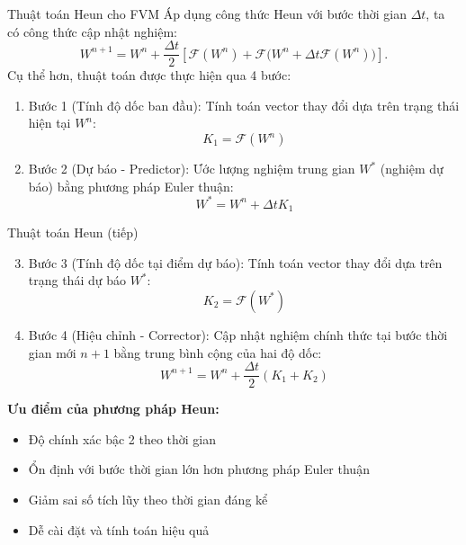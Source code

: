 \documentclass[aspectratio=43,10pt]{beamer}
\begin{document}
\begin{frame}{Thuật toán Heun cho FVM}
Áp dụng công thức Heun với bước thời gian $\Delta t$, ta có công thức cập nhật nghiệm:
\[
W^{n+1} = W^n + \frac{\Delta t}{2} \left[ \mathcal{F}(W^n) + \mathcal{F}\Big(W^n + \Delta t \mathcal{F}(W^n)\Big)\right].
\]
Cụ thể hơn, thuật toán được thực hiện qua 4 bước:
\begin{enumerate}
    \item Bước 1 (Tính độ dốc ban đầu):
    Tính toán vector thay đổi dựa trên trạng thái hiện tại $W^n$:
    \begin{equation*}
        K_1 = \mathcal{F}(W^n)
    \end{equation*}

    \item Bước 2 (Dự báo - Predictor):
    Ước lượng nghiệm trung gian $W^*$ (nghiệm dự báo) bằng phương pháp Euler thuận:
    \begin{equation*}
        W^* = W^n + \Delta t K_1
    \end{equation*}
\end{enumerate}
\end{frame}

\begin{frame}{Thuật toán Heun (tiếp)}
\begin{enumerate}
    \setcounter{enumi}{2}
    \item Bước 3 (Tính độ dốc tại điểm dự báo):
    Tính toán vector thay đổi dựa trên trạng thái dự báo $W^*$:
    \begin{equation*}
        K_2 = \mathcal{F}(W^*)
    \end{equation*}

    \item Bước 4 (Hiệu chỉnh - Corrector):
    Cập nhật nghiệm chính thức tại bước thời gian mới $n+1$ bằng trung bình cộng của hai độ dốc:
    \begin{equation*}
        W^{n+1} = W^n + \frac{\Delta t}{2} (K_1 + K_2)
    \end{equation*}
\end{enumerate}

\textbf{Ưu điểm của phương pháp Heun:}
\begin{itemize}
    \item Độ chính xác bậc 2 theo thời gian
    \item Ổn định với bước thời gian lớn hơn phương pháp Euler thuận
    \item Giảm sai số tích lũy theo thời gian đáng kể
    \item Dễ cài đặt và tính toán hiệu quả
\end{itemize}
\end{frame}
\end{document}
